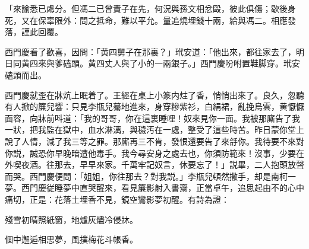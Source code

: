 \begin{myquote}[\markfont]
「來諭悉已䖏分。但馮二已曾責子在先，何況與孫文相忿毆，彼此俱傷；歇後身死，又在保辜限外：問之抵命，難以平允。量追燒埋錢十兩，給與馮二。相應發落，謹此回覆。

\end{myquote}

西門慶看了歡喜，因問：「黄四舅子在那裏？」玳安道：「他出來，都往家去了，明日同黄四來與爹磕頭。黄四丈人與了小的一兩銀子。」西門慶吩咐置鞋脚穿。玳安磕頭而出。

西門慶就歪在牀炕上眠着了。王經在桌上小篆内炷了香，悄悄出來了。良久，忽聽有人掀的簾兒響：只見李瓶兒驀地進來，身穿糝紫衫，白絹裙，亂挽烏雲，黄懨懨面容，向牀前呌道：「我的哥哥，你在這裏睡哩！奴來見你一面。我被那廝告了我一狀，把我監在獄中，血水淋漓，與穢汚在一處，整受了這些時苦。昨日蒙你堂上說了人情，減了我三等之罪。那廝再三不肯，發恨還要告了來㧱你。我待要不來對你説，誠恐你早晚暗遭他毒手。我今尋安身之處去也，你須防範來！沒事，少要在外喫夜酒。往那去，早早來家。千萬牢記奴言，休要忘了！」説畢，二人抱頭放聲而哭。西門慶便問：「姐姐，你往那去？對我説。」李瓶兒頓然撒手，却是南柯一夢。西門慶従睡夢中直哭醒來，看見簾影射入書齋，正當卓午，追思起由不的心中痛切，正是：花落土埋香不見，鏡空鸞影夢初醒。有詩為證：

\begin{myquote}
殘雪初晴照紙窗，地爐灰燼冷侵牀。

個中邂逅相思夢，風撲梅花斗帳香。
\end{myquote}


